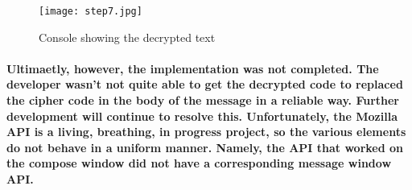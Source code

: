 \begin{figure}[H]
    \centering
    \texttt{[image: step7.jpg]}
    \caption{\label{fig: decrypt2} Console showing the decrypted text}
\end{figure}

\paragraph{Ultimaetly, however, the implementation was not completed. The developer wasn't not quite able to get the decrypted code to replaced the cipher code in the body of the message in a reliable way. Further development will continue to resolve this. Unfortunately, the Mozilla API is a living, breathing, in progress project, so the various elements do not behave in a uniform manner. Namely, the API that worked on the compose window did not have a corresponding message window API.}



